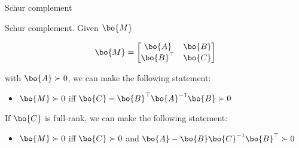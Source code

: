 \documentclass{beamer}
\begin{document}
\begin{frame}{Schur complement}
	\begin{flushleft}
		
		Schur complement. Given $\bo{M}$
		
		\begin{equation}
			\bo{M} = 
			\begin{bmatrix}
				\bo{A} & \bo{B} \\
				\bo{B}^\top & \bo{C}
			\end{bmatrix}
		\end{equation}
		
		with $\bo{A} \succ 0$, we can make the following statement:
		
		\begin{itemize}
			\item $\bo{M} \succ 0$ iff $\bo{C} - \bo{B}^\top\bo{A}^{-1}\bo{B} \succ 0$
		\end{itemize}
		
		\bigskip
		
		If $\bo{C}$ is full-rank, we can make the following statement:
		
		\begin{itemize}
			\item $\bo{M} \succ 0$ iff $\bo{C} \succ 0$ and $\bo{A} - \bo{B}\bo{C}^{-1}\bo{B}^\top \succ 0$
		\end{itemize}		
		
		
		
	\end{flushleft}
\end{frame}
\end{document}
